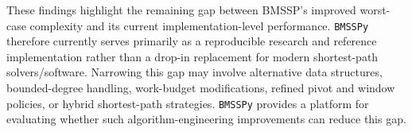 \documentclass[ijoc,blindrev]{informs3} %
\begin{document}
{\color{blue}
These findings highlight the remaining gap between BMSSP's improved worst-case complexity and its current implementation-level performance. \texttt{BMSSPy} therefore currently serves primarily as a reproducible research and reference implementation rather than a drop-in replacement for modern shortest-path solvers/software. Narrowing this gap may involve alternative data structures, bounded-degree handling, work-budget modifications, refined pivot and window policies, or hybrid shortest-path strategies. \texttt{BMSSPy} provides a platform for evaluating whether such algorithm-engineering improvements can reduce this gap.
}




\end{document}
